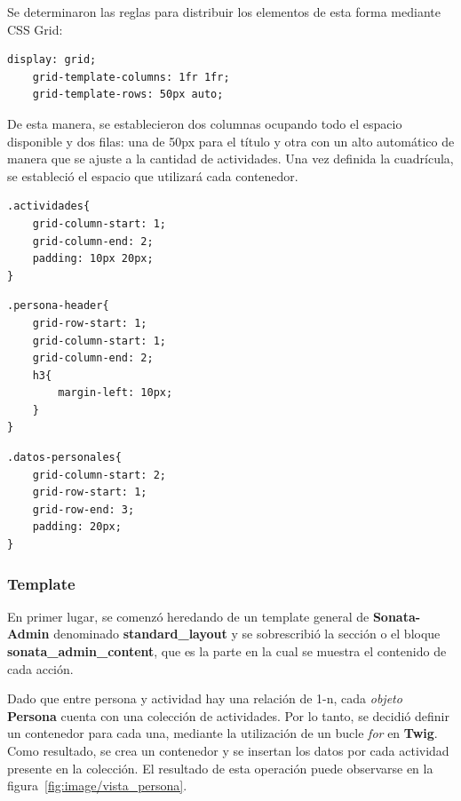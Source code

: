 Se determinaron las reglas para distribuir los elementos de esta forma mediante CSS Grid:

\begin{lstlisting}[caption={Definición de filas y columnas de la cuadrícula.\\Fuente: Elaboración propia.}]
    display: grid;
    grid-template-columns: 1fr 1fr;
    grid-template-rows: 50px auto;
\end{lstlisting}

De esta manera, se establecieron dos columnas ocupando todo el espacio disponible y dos filas: una de 50px para el título y otra con un alto automático de manera que se ajuste a la
cantidad de actividades\@.  Una vez definida la cuadrícula, se estableció el espacio que utilizará cada contenedor.


\begin{lstlisting}[caption={Orientación del contenedor de actividad en la cuadrícula.\\Fuente: Elaboración propia.}]
.actividades{
    grid-column-start: 1;
    grid-column-end: 2;
    padding: 10px 20px;
}
\end{lstlisting}

\newpage
\begin{lstlisting}[caption={Orientación del contenedor del título de la accíon.\\Fuente: Elaboración propia.}]
.persona-header{
    grid-row-start: 1;
    grid-column-start: 1;
    grid-column-end: 2;
    h3{
        margin-left: 10px;
    }
}
\end{lstlisting}
\begin{lstlisting}[caption={Orientación del contenedor de datos personales.\\Fuente: Elaboración propia.}]
.datos-personales{
    grid-column-start: 2;
    grid-row-start: 1;
    grid-row-end: 3;
    padding: 20px;
}
\end{lstlisting}

\subsubsection{Template}%
\label{ssub:template}
En primer lugar, se comenzó heredando de un template general de \textbf{Sonata-Admin} denominado \textbf{standard\_layout} y se sobrescribió la sección o el bloque
\textbf{sonata\_admin\_content}, que es la parte en la cual se muestra el contenido de cada acción.



Dado que entre persona y actividad hay una relación de 1-n, cada \textit{objeto} \textbf{Persona} cuenta con una colección de actividades\@. Por lo tanto, se decidió definir
un contenedor para cada una, mediante la utilización de un bucle \textit{for} en \textbf{Twig}. Como resultado, se crea un contenedor y se insertan los datos por cada actividad
presente en la colección\@. El resultado de esta operación puede observarse en la figura~\ref{fig:image/vista_persona}\@.


